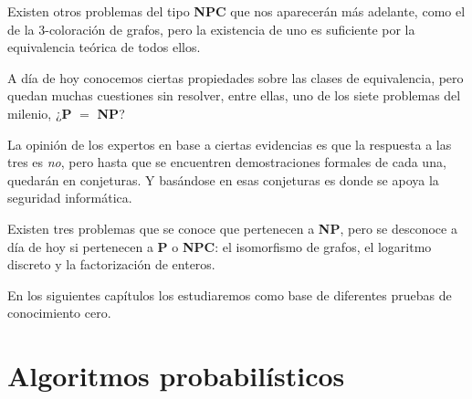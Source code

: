 \hfil

Existen otros problemas del tipo \textbf{NPC} que nos aparecer\'an m\'as adelante,
como el de la 3-coloraci\'on de grafos, pero la existencia de uno es suficiente
por la equivalencia te\'orica de todos ellos.

%

A día de hoy conocemos ciertas propiedades sobre las clases de equivalencia, pero
quedan muchas cuestiones sin resolver, entre ellas, uno de los siete problemas del milenio, ¿\textbf{P} $=$ \textbf{NP}?

La opinión de los expertos en base a ciertas evidencias es que la respuesta a
las tres es \textit{no}, pero hasta que se encuentren demostraciones formales
de cada una, quedarán en conjeturas. Y basándose en esas conjeturas es donde
se apoya la seguridad informática.




Existen tres problemas que se conoce que pertenecen a \textbf{NP}, pero se
desconoce a día de hoy si pertenecen a \textbf{P} o \textbf{NPC}: el
isomorfismo de grafos, el logaritmo discreto y la factorización de enteros.

En los siguientes capítulos los estudiaremos como base de diferentes pruebas
de conocimiento cero.




\section{Algoritmos probabilísticos}


